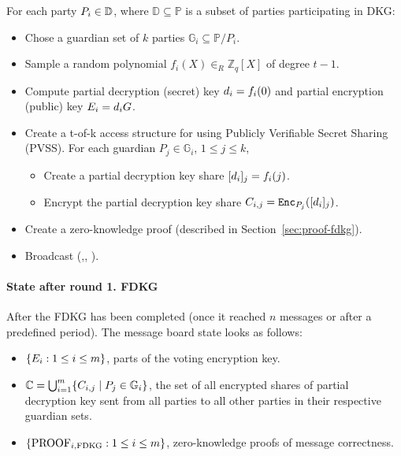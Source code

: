 \documentclass{article}
\begin{document}
For each party $P_{i} \in \mathbb{D}$, where $\mathbb{D} \subseteq  \mathbb{P}$ is a subset of parties participating in DKG:
\begin{itemize}
    \item Chose a guardian set of $k$ parties  $\mathbb{G}_i\subseteq \mathbb{P}/P_i$.
    \item Sample a random polynomial $f_{i}(X) \in_R \mathbb{Z}_q[X]$ of degree $t-1$.
    \item Compute partial decryption (secret) key $d_{i}= f_i(0)$ and partial encryption (public) key $E_{i} = d_{i} G$.
    \item Create a t-of-k access structure for  using Publicly Verifiable Secret Sharing (PVSS). For each guardian $P_{j} \in \mathbb{G}_i$, $1 \leq j \leq k$, \begin{itemize}
    \item Create a partial decryption key share $[d_{i}]_{j}=f_i(j)$.
    \item Encrypt the partial decryption key share $C_{i,j}=\texttt{Enc}_{P_{j}}([d_{i}]_{j})$.
    \end{itemize}
    
    \item Create a zero-knowledge proof (described in Section~\ref{sec:proof-fdkg}).
    \item Broadcast (,, ).
\end{itemize}

\paragraph*{State after round 1. FDKG}

After the FDKG has been completed (once it reached $n$ messages or after a predefined period). The message board state looks as follows:
\begin{itemize}
    \item $\{E_{i} : 1 \leq i \leq m\}$, parts of the voting encryption key.
    \item $\mathbb{C} = \bigcup_{i=1}^{m} \{C_{i,j} \mid P_j \in \mathbb{G}_i\}$, the set of all encrypted shares of partial decryption key sent from all parties to all other parties in their respective guardian sets.
    \item $\{\textrm{PROOF}_{i,\textrm{FDKG}} : 1 \leq i \leq m\}$, zero-knowledge proofs of message correctness.
\end{itemize}
\end{document}
